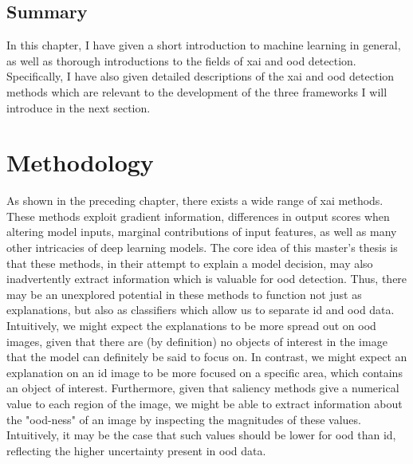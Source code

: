 \documentclass[UKenglish]{uiomasterthesis} %
\theoremstyle{definition}
\begin{document}
\section{Summary}

In this chapter, I have given a short introduction to machine learning in general, as well as thorough introductions to the fields of \ac{xai} and \ac{ood} detection. Specifically, I have also given detailed descriptions of the \ac{xai} and \ac{ood} detection methods which are relevant to the development of the three frameworks I will introduce in the next section.

\chapter{Methodology} \label{chapter:methodology}

As shown in the preceding chapter, there exists a wide range of \ac{xai} methods. These methods exploit gradient information, differences in output scores when altering model inputs, marginal contributions of input features, as well as many other intricacies of deep learning models. The core idea of this master's thesis is that these methods, in their attempt to explain a model decision, may also inadvertently extract information which is valuable for \ac{ood} detection. Thus, there may be an unexplored potential in these methods to function not just as explanations, but also as classifiers which allow us to separate \ac{id} and \ac{ood} data. Intuitively, we might expect the explanations to be more spread out on \ac{ood} images, given that there are (by definition) no objects of interest in the image that the model can definitely be said to focus on. In contrast, we might expect an explanation on an \ac{id} image to be more focused on a specific area, which contains an object of interest. Furthermore, given that saliency methods give a numerical value to each region of the image, we might be able to extract information about the "\ac{ood}-ness" of an image by inspecting the magnitudes of these values. Intuitively, it may be the case that such values should be lower for \ac{ood} than \ac{id}, reflecting the higher uncertainty present in \ac{ood} data.

\end{document}
